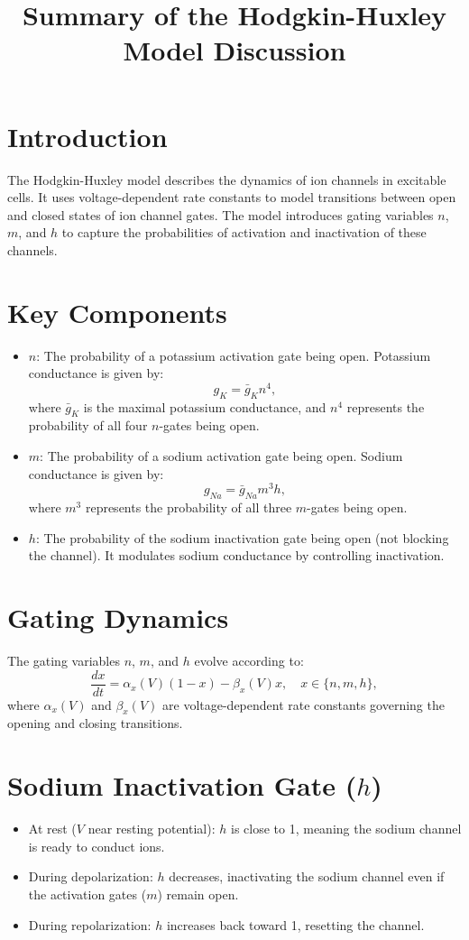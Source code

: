 \documentclass[12pt]{article}
\title{Summary of the Hodgkin-Huxley Model Discussion}
\author{}
\date{}
\begin{document}
\maketitle

\section*{Introduction}
The Hodgkin-Huxley model describes the dynamics of ion channels in excitable cells. It uses voltage-dependent rate constants to model transitions between open and closed states of ion channel gates. The model introduces gating variables \(n\), \(m\), and \(h\) to capture the probabilities of activation and inactivation of these channels.

\section*{Key Components}
\begin{itemize}
    \item \(n\): The probability of a potassium activation gate being open. Potassium conductance is given by:
    \[
    g_K = \bar{g}_K n^4,
    \]
    where \(\bar{g}_K\) is the maximal potassium conductance, and \(n^4\) represents the probability of all four \(n\)-gates being open.
    
    \item \(m\): The probability of a sodium activation gate being open. Sodium conductance is given by:
    \[
    g_{Na} = \bar{g}_{Na} m^3 h,
    \]
    where \(m^3\) represents the probability of all three \(m\)-gates being open.
    
    \item \(h\): The probability of the sodium inactivation gate being open (not blocking the channel). It modulates sodium conductance by controlling inactivation.

\end{itemize}

\section*{Gating Dynamics}
The gating variables \(n\), \(m\), and \(h\) evolve according to:
\[
\frac{dx}{dt} = \alpha_x(V)(1 - x) - \beta_x(V)x, \quad x \in \{n, m, h\},
\]
where \(\alpha_x(V)\) and \(\beta_x(V)\) are voltage-dependent rate constants governing the opening and closing transitions.

\section*{Sodium Inactivation Gate (\(h\))}
\begin{itemize}
    \item At rest (\(V\) near resting potential): \(h\) is close to 1, meaning the sodium channel is ready to conduct ions.
    \item During depolarization: \(h\) decreases, inactivating the sodium channel even if the activation gates (\(m\)) remain open.
    \item During repolarization: \(h\) increases back toward 1, resetting the channel.
\end{itemize}
\end{document}
